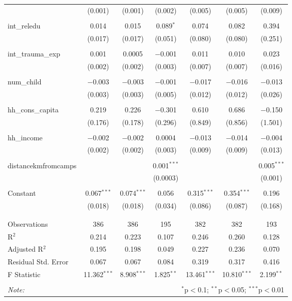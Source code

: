 \begin{table}[H]
\begin{tabular}{@{\extracolsep{4pt}}lcccccc}
  & (0.001) & (0.001) & (0.002) & (0.005) & (0.005) & (0.009) \\ 
  & & & & & & \\ 
 int\_reledu & 0.014 & 0.015 & 0.089$^{*}$ & 0.074 & 0.082 & 0.394 \\ 
  & (0.017) & (0.017) & (0.051) & (0.080) & (0.080) & (0.251) \\ 
  & & & & & & \\ 
 int\_trauma\_exp & 0.001 & 0.0005 & $-$0.001 & 0.011 & 0.010 & 0.023 \\ 
  & (0.002) & (0.002) & (0.003) & (0.007) & (0.007) & (0.016) \\ 
  & & & & & & \\ 
 num\_child & $-$0.003 & $-$0.003 & $-$0.001 & $-$0.017 & $-$0.016 & $-$0.013 \\ 
  & (0.003) & (0.003) & (0.005) & (0.012) & (0.012) & (0.026) \\ 
  & & & & & & \\ 
 hh\_cons\_capita & 0.219 & 0.226 & $-$0.301 & 0.610 & 0.686 & $-$0.150 \\ 
  & (0.176) & (0.178) & (0.296) & (0.849) & (0.856) & (1.501) \\ 
  & & & & & & \\ 
 hh\_income & $-$0.002 & $-$0.002 & 0.0004 & $-$0.013 & $-$0.014 & $-$0.004 \\ 
  & (0.002) & (0.002) & (0.003) & (0.009) & (0.009) & (0.013) \\ 
  & & & & & & \\ 
 distancekmfromcamps &  &  & 0.001$^{***}$ &  &  & 0.005$^{***}$ \\ 
  &  &  & (0.0003) &  &  & (0.001) \\ 
  & & & & & & \\ 
 Constant & 0.067$^{***}$ & 0.074$^{***}$ & 0.056 & 0.315$^{***}$ & 0.354$^{***}$ & 0.196 \\ 
  & (0.018) & (0.018) & (0.034) & (0.086) & (0.087) & (0.168) \\ 
  & & & & & & \\ 
\hline \\[-1.8ex] 
Observations & 386 & 386 & 195 & 382 & 382 & 193 \\ 
R$^{2}$ & 0.214 & 0.223 & 0.107 & 0.246 & 0.260 & 0.128 \\ 
Adjusted R$^{2}$ & 0.195 & 0.198 & 0.049 & 0.227 & 0.236 & 0.070 \\ 
Residual Std. Error & 0.067 & 0.067 & 0.084 & 0.319 & 0.317 & 0.416 \\ 
F Statistic & 11.362$^{***}$ & 8.908$^{***}$ & 1.825$^{**}$ & 13.461$^{***}$ & 10.810$^{***}$ & 2.199$^{**}$ \\ 
\hline 
\hline \\[-1.8ex] 
\textit{Note:}  & \multicolumn{6}{r}{$^{*}$p$<$0.1; $^{**}$p$<$0.05; $^{***}$p$<$0.01} \\ 
\end{tabular} 
\end{table} 
